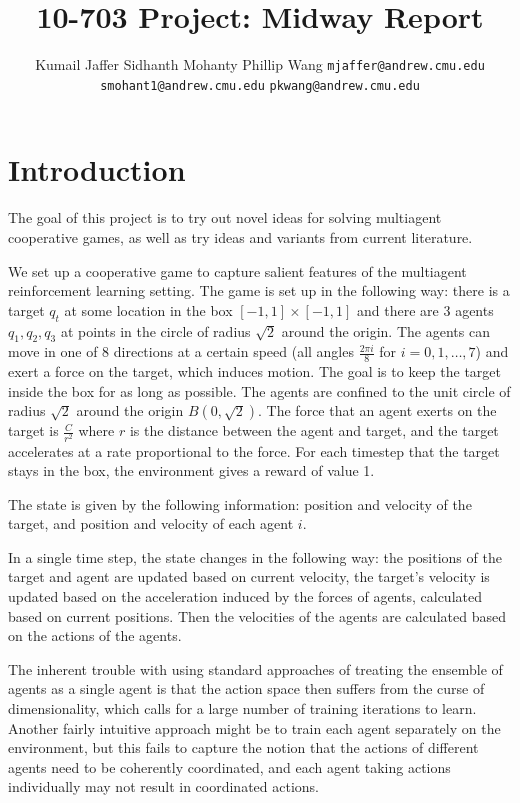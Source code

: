 \documentclass{article}
\title{10-703 Project: Midway Report}
\author{Kumail Jaffer \And Sidhanth Mohanty \And Phillip
Wang
\AND
\texttt{mjaffer@andrew.cmu.edu} \And
\texttt{smohant1@andrew.cmu.edu}\And
\texttt{pkwang@andrew.cmu.edu}}
\begin{document}
\maketitle

\section{Introduction}
The goal of this project is to try out novel ideas for
solving multiagent cooperative games, as well as try
ideas and variants from current literature.

We set up a cooperative game to capture salient features
of the multiagent reinforcement learning setting.
The game is set up in the following way: there is a target
$q_t$ at some location in the box $[-1,1]\times[-1,1]$
and there are 3 agents $q_1,q_2,q_3$ at points in the circle of
radius $\sqrt{2}$ around the origin. The agents can move
in one of 8 directions at a certain speed (all angles
$\frac{2\pi i}{8}$ for $i=0,1,\ldots,7$) and exert a force
on the target, which induces motion. The goal is to
keep the target inside the box for as long as possible.
The agents are confined to the unit circle of radius
$\sqrt{2}$ around the origin $B(0,\sqrt{2})$.
The force that an agent exerts on the target is $\frac{C}{r^2}$
where $r$ is the distance between the agent and target, and
the target accelerates at a rate proportional to the force.
For each timestep that the target stays in the box, the
environment gives a reward of value 1.

The state is given by the following information: position and velocity
of the target, and position and velocity of each agent $i$.

In a single time step, the state changes in the following way:
the positions of the target and agent are updated based on
current velocity, the target's velocity is updated
based on the acceleration induced by the forces
of agents, calculated based on current positions. Then the
velocities of the agents are calculated based on the
actions of the agents.

The inherent trouble with using standard approaches of treating
the ensemble of agents as a single agent is that the action
space then suffers from the curse of dimensionality, which
calls for a large number of training iterations to
learn. Another fairly intuitive approach might be to
train each agent separately on the environment, but
this fails to capture the notion that the actions of
different agents need to be coherently coordinated,
and each agent taking actions individually may not
result in coordinated actions.
\end{document}
